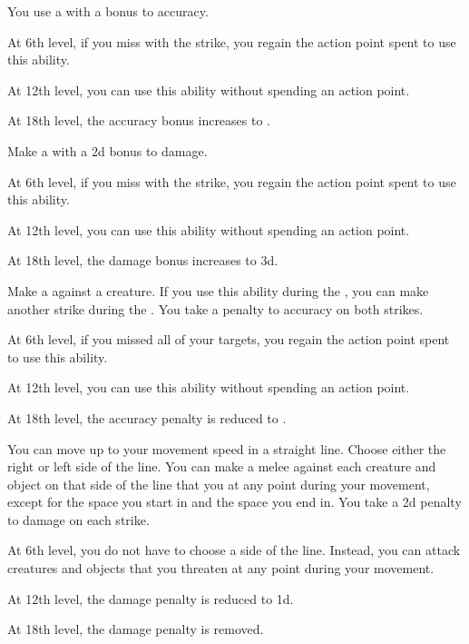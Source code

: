 {             You use a  with a  bonus to accuracy.
            \par At 6th level, if you miss with the strike, you regain the action point spent to use this ability.
            \par At 12th level, you can use this ability without spending an action point.
            \par At 18th level, the accuracy bonus increases to .

             Make a  with a \plus2d bonus to damage.
            \par At 6th level, if you miss with the strike, you regain the action point spent to use this ability.
            \par At 12th level, you can use this ability without spending an action point.
            \par At 18th level, the damage bonus increases to \plus3d.

             Make a  against a creature.
            If you use this ability during the , you can make another strike during the .
            You take a  penalty to accuracy on both strikes.
            \par At 6th level, if you missed all of your targets, you regain the action point spent to use this ability.
            \par At 12th level, you can use this ability without spending an action point.
            \par At 18th level, the accuracy penalty is reduced to .

             You can move up to your movement speed in a straight line.
            Choose either the right or left side of the line.
            You can make a melee  against each creature and object on that side of the line that you  at any point during your movement, except for the space you start in and the space you end in.
            You take a \minus2d penalty to damage on each strike.
            \par At 6th level, you do not have to choose a side of the line.
            Instead, you can attack creatures and objects that you threaten at any point during your movement.
            \par At 12th level, the damage penalty is reduced to \minus1d.
            \par At 18th level, the damage penalty is removed.

}
